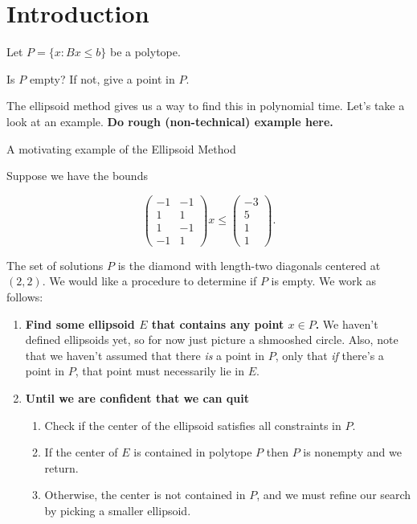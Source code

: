 \section{Introduction}
Let \(P = \{x : Bx \leq b\}\) be a polytope.
\begin{question}
  Is \(P\) empty? If not, give a point in \(P\).
\end{question}

The ellipsoid method gives us a way to find this in polynomial time. Let's take
a look at an example.  \textbf{\color{red}Do rough (non-technical) example here.}

\begin{examplebox}{A motivating example of the Ellipsoid Method}
\begin{example}
  \def\A{\left(\begin{matrix} -1 & -1 \\ 1 & 1 \\ 1 & -1 \\ -1 & 1 \end{matrix}\right) }
  \def\b{\left(\begin{matrix} -3\\ 5\\ 1\\ 1 \end{matrix}\right)}
  Suppose we have the bounds

  \[\A x \leq \b.\]
  
  The set of solutions \(P\) is the diamond with length-two diagonals centered at
  \((2,2)\). We would like a procedure to determine if \(P\) is empty. We work
  as follows:
  \begin{enumerate}
    \item \textbf{Find some ellipsoid \(E\) that contains any point \(x \in P\).}
      We haven't defined ellipsoids yet, so for now just picture a shmooshed
      circle. Also, note that we haven't assumed that there \textit{is} a point
      in \(P\), only that \textit{if} there's a point in \(P\), that point
      must necessarily lie in \(E\).

    \item \textbf{Until we are confident that we can quit}
      \begin{enumerate}
        \item Check if the center of the ellipsoid satisfies all constraints in
          \(P\).
        \item If the center of \(E\) is contained in polytope \(P\) then
          \(P\) is nonempty and we return.

        \item Otherwise, the center is not contained in \(P\), and we must
          refine our search by picking a smaller ellipsoid.
      \end{enumerate}
  \end{enumerate}
\end{example}
\end{examplebox}


